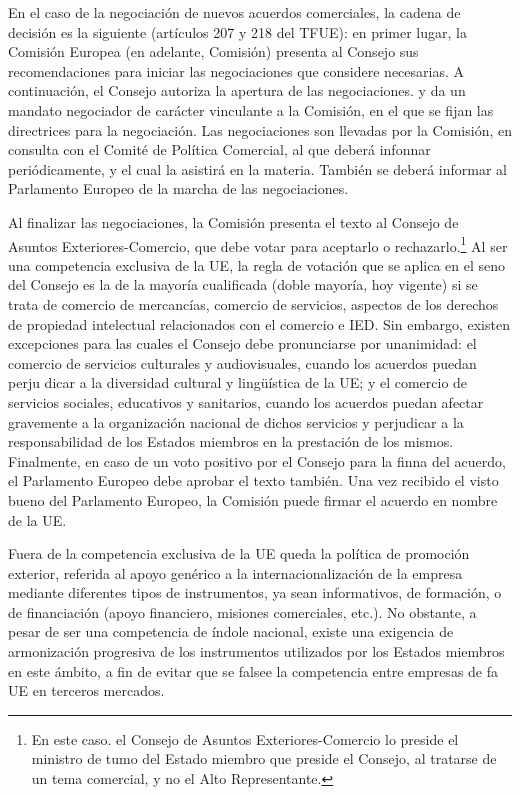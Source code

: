 \documentclass[10pt,a4paper]{article}
\begin{document}
En el caso de la negociación de nuevos acuerdos comerciales, la cadena de decisión es la siguiente (artículos 207 y 218 del TFUE): en primer lugar, la Comisión Europea (en adelante, Comisión) presenta al Consejo sus recomendaciones para iniciar las negociaciones que considere necesarias. A continuación, el Consejo autoriza la apertura de las negociaciones. y da un mandato negociador de carácter vinculante a la Comisión, en el que se fijan las directrices para la negociación. Las negociaciones son llevadas por la Comisión, en consulta con el Comité de Política Comercial, al que deberá infonnar periódicamente, y el cual la asistirá en la materia. También se deberá informar al Parlamento Europeo de la marcha de las negociaciones. 

Al finalizar las negociaciones, la Comisión presenta el texto al Consejo de Asuntos Exteriores-Comercio, que debe votar para aceptarlo o rechazarlo.\footnote{%
    En este caso. el Consejo de Asuntos Exteriores-Comercio lo preside el ministro de tumo del Estado miembro que preside el Consejo, al tratarse de un tema comercial, y no el Alto Representante.
} Al ser una competencia exclusiva de la UE, la regla de votación que se aplica en el seno del Consejo es la de la mayoría cualificada (doble mayoría, hoy vigente) si se trata de comercio de mercancías, comercio de servicios, aspectos de los derechos de propiedad intelectual relacionados con el comercio e IED. Sin embargo, existen excepciones para las cuales el Consejo debe pronunciarse por unanimidad: el comercio de servicios culturales y audiovisuales, cuando los acuerdos puedan perju dicar a la diversidad cultural y lingüística de la UE; y el comercio de servicios sociales, educativos y sanitarios, cuando los acuerdos puedan afectar gravemente a la organización nacional de dichos servicios y perjudicar a la responsabilidad de los Estados miembros en la prestación de los mismos. Finalmente, en caso de un voto positivo por el Consejo para la finna del acuerdo, el Parlamento Europeo debe aprobar el texto también. Una vez recibido el visto bueno del Parlamento Europeo, la Comisión puede firmar el acuerdo en nombre de la UE. 

Fuera de la competencia exclusiva de la UE queda la política de promoción exterior, referida al apoyo genérico a la internacionalización de la empresa mediante diferentes tipos de instrumentos, ya sean informativos, de formación, o de financiación (apoyo financiero, misiones comerciales, etc.). No obstante, a pesar de ser una competencia de índole nacional, existe una exigencia de armonización progresiva de los instrumentos utilizados por los Estados miembros en este ámbito, a fin de evitar que se falsee la competencia entre empresas de fa UE en terceros mercados.
\end{document}
